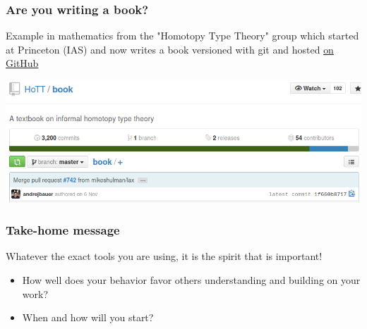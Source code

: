 \documentclass[c]{beamer} %
\begin{document}
\begin{frame}
  \frametitle{Are you writing a book?}
  Example in \alert{mathematics} from the "Homotopy Type Theory" group which started at Princeton (IAS) and now writes a book versioned with git and hosted \href{https://github.com/HoTT/book}{on GitHub}
  
  \bigskip
  
  \begin{center}
    \includegraphics[width=\textwidth,height=\textheight,keepaspectratio=true]{HoTT_book}%
  \end{center}
\end{frame}

  

\begin{frame}
  \frametitle{Take-home message}
  Whatever the exact tools you are using, it is the spirit that is important!
  
  \bigskip
  \pause
  
  \begin{itemize}
  \item How well does your behavior favor others understanding and building on your work?
    \bigskip
  \item When and how will you start?
  \end{itemize}
\end{frame}
\end{document}

